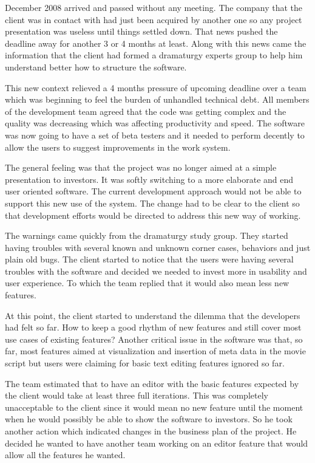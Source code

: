 \documentclass[lnbip]{svmultln}
\begin{document}
December 2008 arrived and passed without any meeting. The company that
the client was in contact with had just been acquired by another one
so any project presentation was useless until things settled
down. That news pushed the deadline away for another 3 or 4 months at
least. Along with this news came the information that the client had
formed a dramaturgy experts group to help him understand better how to
structure the software.

This new context relieved a 4 months pressure of upcoming deadline
over a team which was beginning to feel the burden of unhandled
technical debt. All members of the development team agreed that the
code was getting complex and the quality was decreasing which was
affecting productivity and speed. The software was now going to have a
set of beta testers and it needed to perform decently to allow the
users to suggest improvements in the work system.

The general feeling was that the project was no longer aimed at a
simple presentation to investors. It was softly switching to a more
elaborate and end user oriented software. The current development
approach would not be able to support this new use of the system. The
change had to be clear to the client so that development efforts would
be directed to address this new way of working.

The warnings came quickly from the dramaturgy study group. They
started having troubles with several known and unknown corner cases,
behaviors and just plain old bugs. The client started to notice that
the users were having several troubles with the software and decided
we needed to invest more in usability and user experience. To which
the team replied that it would also mean less new features.

At this point, the client started to understand the dilemma that the
developers had felt so far. How to keep a good rhythm of new features
and still cover most use cases of existing features? Another critical
issue in the software was that, so far, most features aimed at
visualization and insertion of meta data in the movie script but users
were claiming for basic text editing features ignored so far.

The team estimated that to have an editor with the basic features
expected by the client would take at least three full iterations. This
was completely unacceptable to the client since it would mean no new
feature until the moment when he would possibly be able to show the
software to investors. So he took another action which indicated
changes in the business plan of the project. He decided he wanted to
have another team working on an editor feature that would allow all
the features he wanted.
\end{document}

